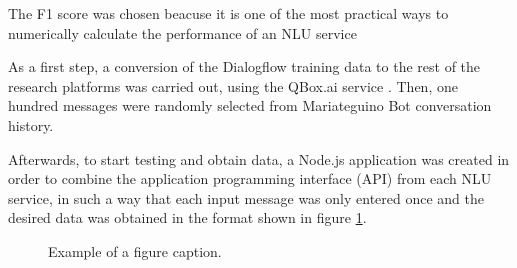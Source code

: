 \documentclass[conference]{IEEEtran}
\begin{document}
The F1 score was chosen beacuse it is one of the most practical ways to numerically calculate the performance of an NLU service

As a first step, a conversion of the Dialogflow training data to the rest of the research platforms was carried out, using the QBox.ai service \cite{qbox2020}. Then, one hundred messages were randomly selected from Mariateguino Bot conversation history.

Afterwards, to start testing and obtain data, a Node.js application was created in order to combine the application programming interface (API) from each NLU service, in such a way that each input message was only entered once and the desired data was obtained in the format shown in figure \ref{fig:nludata}.

\begin{figure}[htbp]
    \centerline{}
    \caption{Example of a figure caption.}
    \label{fig:nludata}
\end{figure}
\end{document}
